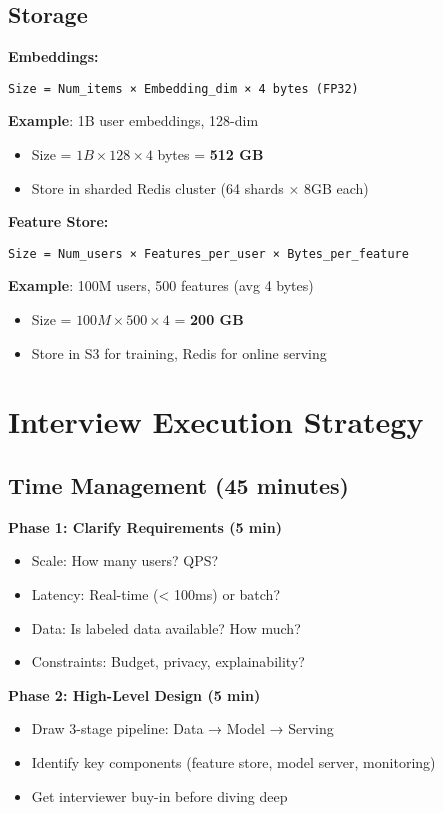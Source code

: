 \documentclass[10pt]{article}
\begin{document}
\subsection{Storage}

\textbf{Embeddings:}
\begin{verbatim}
Size = Num_items × Embedding_dim × 4 bytes (FP32)
\end{verbatim}

\textbf{Example}: 1B user embeddings, 128-dim
\begin{itemize}
\item Size = $1B \times 128 \times 4$ bytes = \textbf{512 GB}
\item Store in sharded Redis cluster (64 shards × 8GB each)
\end{itemize}

\textbf{Feature Store:}
\begin{verbatim}
Size = Num_users × Features_per_user × Bytes_per_feature
\end{verbatim}

\textbf{Example}: 100M users, 500 features (avg 4 bytes)
\begin{itemize}
\item Size = $100M \times 500 \times 4$ = \textbf{200 GB}
\item Store in S3 for training, Redis for online serving
\end{itemize}

\section{Interview Execution Strategy}

\subsection{Time Management (45 minutes)}

\textbf{Phase 1: Clarify Requirements (5 min)}
\begin{itemize}
\item Scale: How many users? QPS?
\item Latency: Real-time (< 100ms) or batch?
\item Data: Is labeled data available? How much?
\item Constraints: Budget, privacy, explainability?
\end{itemize}

\textbf{Phase 2: High-Level Design (5 min)}
\begin{itemize}
\item Draw 3-stage pipeline: Data → Model → Serving
\item Identify key components (feature store, model server, monitoring)
\item Get interviewer buy-in before diving deep
\end{itemize}
\end{document}
